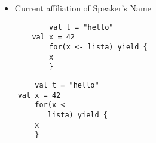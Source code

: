 \documentclass{beamer}
\begin{document}
\begin{frame}[fragile]
  \begin{itemize}
    \item  Current affiliation of Speaker's Name
    \begin{lstlisting}
		val t = "hello" 
	val x = 42 
		for(x <- lista) yield {
 		x
		}

    \end{lstlisting}   
  \end{itemize}
    \begin{semiverbatim}
  \begin{lstlisting}
		val t = "hello" 
	val x = 42 
		for(x <-
		   lista) yield {
 		x
		}

 \end{lstlisting}
   \end{semiverbatim}
\end{frame}
\end{document}
